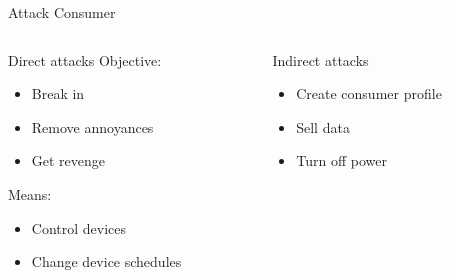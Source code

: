 \begin{frame}{Attack Consumer}
  \begin{columns}[T]
    \begin{column}{0.5\textwidth}
    \begin{block}{Direct attacks}
      Objective:
      \begin{itemize}
        \item Break in
        \item Remove annoyances
        \item Get revenge
      \end{itemize}
      Means:
      \begin{itemize}
        \item Control devices
        \item Change device schedules
      \end{itemize}
    \end{block}
\end{column}
\begin{column}{0.5\textwidth}
  \begin{block}{Indirect attacks}
    \begin{itemize}
      \item Create consumer profile
      \item Sell data
      \item Turn off power
    \end{itemize}
  \end{block}
\end{column}
\end{columns}
\end{frame}
